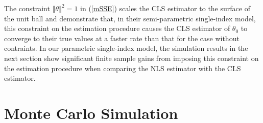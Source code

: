 \documentclass[a4paper,12pt,times,numbered,print,index]{report}
\numberwithin{equation}{section}
\begin{document}
	
	
	The constraint $\left\Vert \theta \right\Vert ^{2}=1
	$ in (\ref{mSSE}) scales the CLS estimator to the surface of
	the unit ball and \cite{zhou2018semiparametric} demonstrate that, in their semi-parametric single-index model, this constraint on the estimation procedure causes the CLS estimator of $\theta _{0}$ to converge to their true values at a faster rate than that for the case without contraints. In our parametric single-index model, the simulation results in the next section show significant finite sample gains from imposing this constraint on the estimation procedure when comparing the NLS estimator 
	with the CLS estimator. 
	
	\section{Monte Carlo Simulation }
\end{document}
